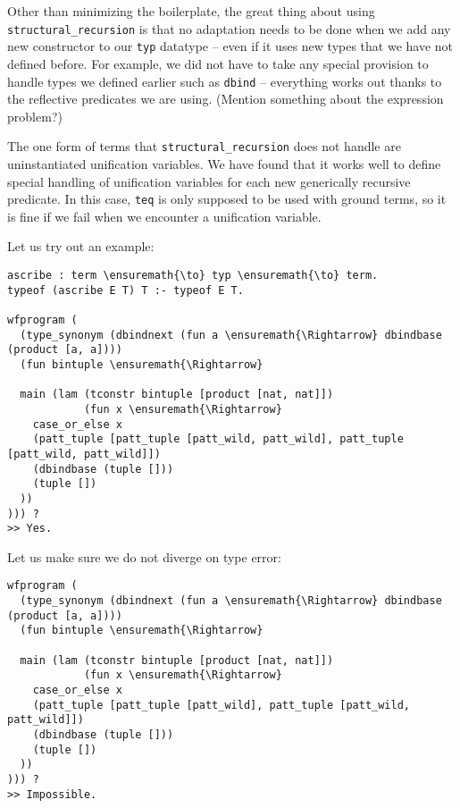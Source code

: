 Other than minimizing the boilerplate, the great thing about using
\texttt{structural\_recursion} is that no adaptation needs to be done
when we add any new constructor to our \texttt{typ} datatype -- even if
it uses new types that we have not defined before. For example, we did
not have to take any special provision to handle types we defined
earlier such as \texttt{dbind} -- everything works out thanks to the
reflective predicates we are using. (Mention something about the
expression problem?)

The one form of terms that \texttt{structural\_recursion} does not
handle are uninstantiated unification variables. We have found that it
works well to define special handling of unification variables for each
new generically recursive predicate. In this case, \texttt{teq} is only
supposed to be used with ground terms, so it is fine if we fail when we
encounter a unification variable.

Let us try out an example:

\begin{verbatim}
ascribe : term \ensuremath{\to} typ \ensuremath{\to} term.
typeof (ascribe E T) T :- typeof E T.

wfprogram (
  (type_synonym (dbindnext (fun a \ensuremath{\Rightarrow} dbindbase (product [a, a])))
  (fun bintuple \ensuremath{\Rightarrow} 
  
  main (lam (tconstr bintuple [product [nat, nat]])
            (fun x \ensuremath{\Rightarrow} 
    case_or_else x
    (patt_tuple [patt_tuple [patt_wild, patt_wild], patt_tuple [patt_wild, patt_wild]])
    (dbindbase (tuple []))
    (tuple [])
  ))
))) ?
>> Yes.
\end{verbatim}

Let us make sure we do not diverge on type error:

\begin{verbatim}
wfprogram (
  (type_synonym (dbindnext (fun a \ensuremath{\Rightarrow} dbindbase (product [a, a])))
  (fun bintuple \ensuremath{\Rightarrow} 
  
  main (lam (tconstr bintuple [product [nat, nat]])
            (fun x \ensuremath{\Rightarrow} 
    case_or_else x
    (patt_tuple [patt_tuple [patt_wild], patt_tuple [patt_wild, patt_wild]])
    (dbindbase (tuple []))
    (tuple [])
  ))
))) ?
>> Impossible.
\end{verbatim}
